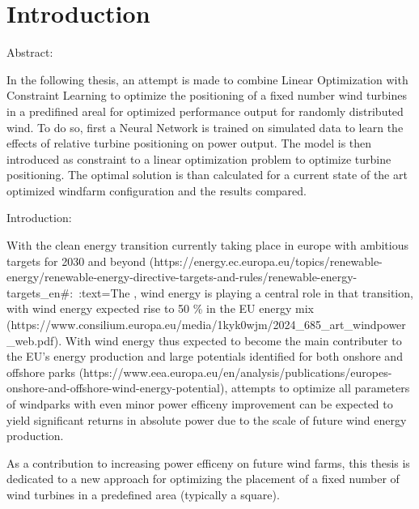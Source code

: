 
\chapter{Introduction}\label{chapter:introduction}

Abstract: 

In the following thesis, an attempt is made to combine Linear Optimization with Constraint Learning to optimize the positioning of a fixed number wind turbines in a predifined areal for optimized performance output for randomly distributed wind. To do so, first a Neural Network is trained on simulated data to learn the effects of relative turbine positioning on power output. The model is then introduced as constraint to a linear optimization problem to optimize turbine positioning. The optimal solution is than calculated for a current state of the art optimized windfarm configuration and the results compared. 



Introduction: 

With the clean energy transition currently taking place in europe with ambitious targets for 2030 and beyond (https://energy.ec.europa.eu/topics/renewable-energy/renewable-energy-directive-targets-and-rules/renewable-energy-targets_en#:~:text=The%
, wind energy is playing a central role in that transition, with wind energy expected rise to 50 \% in the EU energy mix (https://www.consilium.europa.eu/media/1kyk0wjm/2024_685_art_windpower_web.pdf). With wind energy thus expected to become the main contributer to the EU's energy production and large potentials identified for both onshore and offshore parks (https://www.eea.europa.eu/en/analysis/publications/europes-onshore-and-offshore-wind-energy-potential), attempts to optimize all parameters of windparks with even minor power efficeny improvement can be expected to yield significant returns in absolute power due to the scale of future wind energy production. 

As a contribution to increasing power efficeny on future wind farms, this thesis is dedicated to a new approach for optimizing the placement of a fixed number of wind turbines in a predefined area (typically a square).

